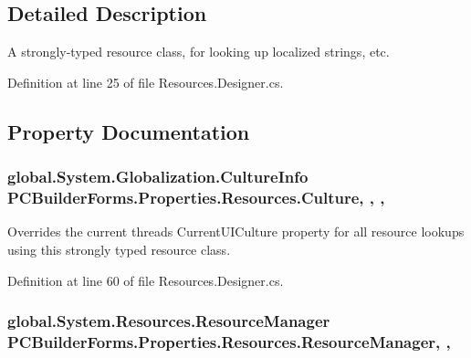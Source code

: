 \subsection{Detailed Description}
A strongly-\/typed resource class, for looking up localized strings, etc. 



Definition at line 25 of file Resources.\+Designer.\+cs.



\subsection{Property Documentation}
\subsubsection[{\texorpdfstring{Culture}{Culture}}]{\setlength{\rightskip}{0pt plus 5cm}global.\+System.\+Globalization.\+Culture\+Info P\+C\+Builder\+Forms.\+Properties.\+Resources.\+Culture\hspace{0.3cm}{\ttfamily [static]}, {\ttfamily [get]}, {\ttfamily [set]}, {\ttfamily [package]}}\hypertarget{class_p_c_builder_forms_1_1_properties_1_1_resources_a815a910fd4361950f9ebd6fcf6209cc8}{}\label{class_p_c_builder_forms_1_1_properties_1_1_resources_a815a910fd4361950f9ebd6fcf6209cc8}


Overrides the current thread\textquotesingle{}s Current\+U\+I\+Culture property for all resource lookups using this strongly typed resource class. 



Definition at line 60 of file Resources.\+Designer.\+cs.

\subsubsection[{\texorpdfstring{Resource\+Manager}{ResourceManager}}]{\setlength{\rightskip}{0pt plus 5cm}global.\+System.\+Resources.\+Resource\+Manager P\+C\+Builder\+Forms.\+Properties.\+Resources.\+Resource\+Manager\hspace{0.3cm}{\ttfamily [static]}, {\ttfamily [get]}, {\ttfamily [package]}}\hypertarget{class_p_c_builder_forms_1_1_properties_1_1_resources_ac6548299b72ecf6fdd7e522ea4c49acf}{}\label{class_p_c_builder_forms_1_1_properties_1_1_resources_ac6548299b72ecf6fdd7e522ea4c49acf}


